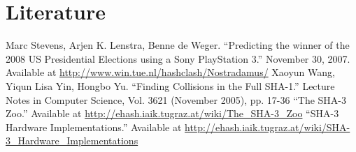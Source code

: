 \documentclass{article}
\begin{document}
\section{Literature}

\begin{thebibliography}{9}
   Marc Stevens, Arjen K. Lenstra, Benne de Weger. ``Predicting the winner of the 2008 US Presidential Elections using a Sony PlayStation 3.'' November 30, 2007. Available at \url{http://www.win.tue.nl/hashclash/Nostradamus/}
   Xaoyun Wang, Yiqun Lisa Yin, Hongbo Yu. ``Finding Collisions in the Full SHA-1.'' Lecture Notes in Computer Science, Vol. 3621 (November 2005), pp. 17-36
   ``The SHA-3 Zoo.'' Available at \url{http://ehash.iaik.tugraz.at/wiki/The_SHA-3_Zoo}
   ``SHA-3 Hardware Implementations.'' Available at \url{http://ehash.iaik.tugraz.at/wiki/SHA-3_Hardware_Implementations}
\end{thebibliography}
\end{document}
